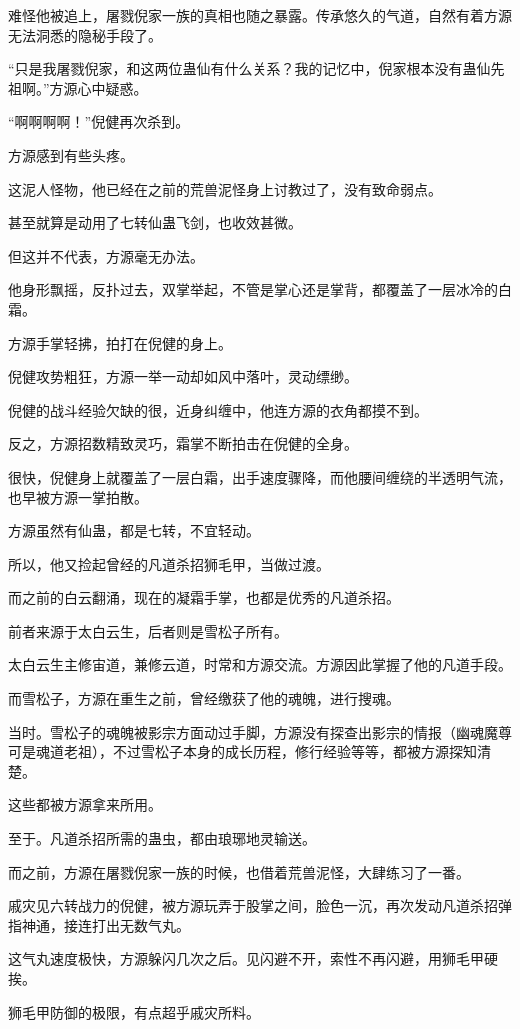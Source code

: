 \begin{this_body}
难怪他被追上，屠戮倪家一族的真相也随之暴露。传承悠久的气道，自然有着方源无法洞悉的隐秘手段了。

“只是我屠戮倪家，和这两位蛊仙有什么关系？我的记忆中，倪家根本没有蛊仙先祖啊。”方源心中疑惑。

“啊啊啊啊！”倪健再次杀到。

方源感到有些头疼。

这泥人怪物，他已经在之前的荒兽泥怪身上讨教过了，没有致命弱点。

甚至就算是动用了七转仙蛊飞剑，也收效甚微。

但这并不代表，方源毫无办法。

他身形飘摇，反扑过去，双掌举起，不管是掌心还是掌背，都覆盖了一层冰冷的白霜。

方源手掌轻拂，拍打在倪健的身上。

倪健攻势粗狂，方源一举一动却如风中落叶，灵动缥缈。

倪健的战斗经验欠缺的很，近身纠缠中，他连方源的衣角都摸不到。

反之，方源招数精致灵巧，霜掌不断拍击在倪健的全身。

很快，倪健身上就覆盖了一层白霜，出手速度骤降，而他腰间缠绕的半透明气流，也早被方源一掌拍散。

方源虽然有仙蛊，都是七转，不宜轻动。

所以，他又捡起曾经的凡道杀招狮毛甲，当做过渡。

而之前的白云翻涌，现在的凝霜手掌，也都是优秀的凡道杀招。

前者来源于太白云生，后者则是雪松子所有。

太白云生主修宙道，兼修云道，时常和方源交流。方源因此掌握了他的凡道手段。

而雪松子，方源在重生之前，曾经缴获了他的魂魄，进行搜魂。

当时。雪松子的魂魄被影宗方面动过手脚，方源没有探查出影宗的情报（幽魂魔尊可是魂道老祖），不过雪松子本身的成长历程，修行经验等等，都被方源探知清楚。

这些都被方源拿来所用。

至于。凡道杀招所需的蛊虫，都由琅琊地灵输送。

而之前，方源在屠戮倪家一族的时候，也借着荒兽泥怪，大肆练习了一番。

戚灾见六转战力的倪健，被方源玩弄于股掌之间，脸色一沉，再次发动凡道杀招弹指神通，接连打出无数气丸。

这气丸速度极快，方源躲闪几次之后。见闪避不开，索性不再闪避，用狮毛甲硬挨。

狮毛甲防御的极限，有点超乎戚灾所料。


\end{this_body}
